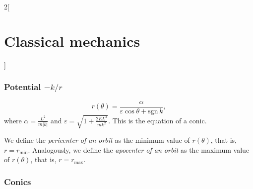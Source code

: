 \documentclass[../../../main.tex]{subfiles}
\begin{document}
\begin{multicols}{2}[\section{Classical mechanics}]
    \subsubsection{Potential $-k/r$}
    \begin{prop}
        $$r(\theta)=\frac{\alpha}{\varepsilon\cos\theta+\text{sgn}\,k},$$where $\displaystyle\alpha=\frac{L^2}{m|k|}$ and $\displaystyle\varepsilon=\sqrt{1+\frac{2EL^2}{mk^2}}$. This is the equation of a conic.
    \end{prop}
    \begin{definition}
        We define the \textit{pericenter of an orbit} as the minimum value of $r(\theta)$, that is, $r=r_\text{min}$. Analogously, we define the \textit{apocenter of an orbit} as the maximum value of $r(\theta)$, that is, $r=r_\text{max}$.
    \end{definition}
    \subsubsection{Conics}
\end{multicols}
\end{document}
